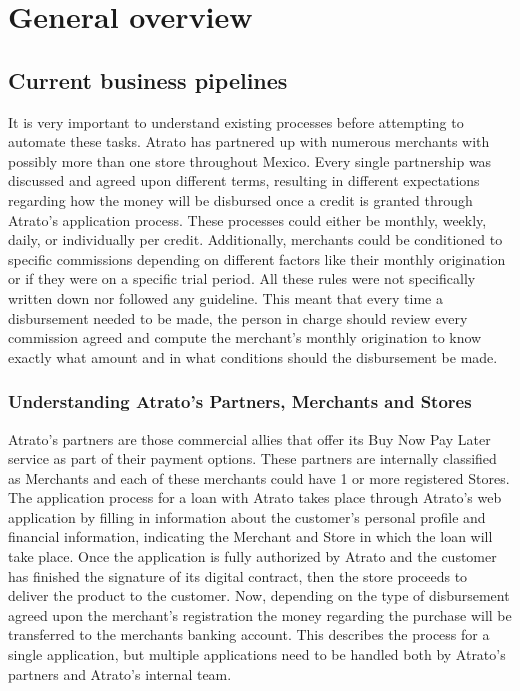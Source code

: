 \chapter{General overview}


\section{Current business pipelines}

It is very important to understand existing processes before attempting to automate these tasks. Atrato has partnered up with numerous merchants with possibly more than one store throughout Mexico. Every single partnership was discussed and agreed upon different terms, resulting in different expectations regarding how the money will be disbursed once a credit is granted through Atrato’s application process. These processes could either be monthly, weekly, daily, or individually per credit. Additionally, merchants could be conditioned to specific commissions depending on different factors like their monthly origination or if they were on a specific trial period. All these rules were not specifically written down nor followed any guideline. This meant that every time a disbursement needed to be made, the person in charge should review every commission agreed and compute the merchant’s monthly origination to know exactly what amount and in what conditions should the disbursement be made.

\subsection{Understanding Atrato’s Partners, Merchants and Stores}

Atrato’s partners are those commercial allies that offer its Buy Now Pay Later service as part of their payment options. These partners are internally classified as Merchants and each of these merchants could have 1 or more registered Stores. 
The application process for a loan with Atrato takes place through Atrato’s web application by filling in information about the customer’s personal profile and financial information, indicating the Merchant and Store in which the loan will take place. Once the application is fully authorized by Atrato and the customer has finished the signature of its digital contract, then the store proceeds to deliver the product to the customer. Now, depending on the type of disbursement agreed upon the merchant’s registration the money regarding the purchase will be transferred to the merchants banking account. This describes the process for a single application, but multiple applications need to be handled both by Atrato’s partners and Atrato’s internal team.

